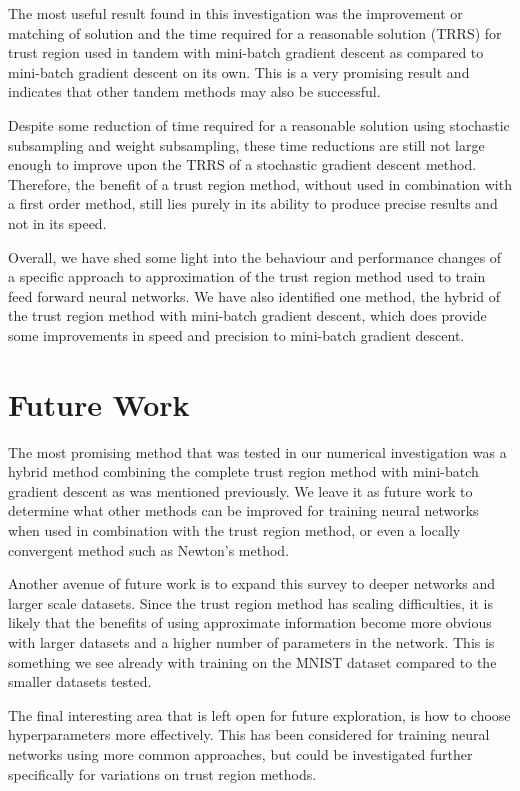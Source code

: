 \documentclass[letterpaper,12pt,titlepage,oneside,final]{book}
\begin{document}
	The most useful result found in this investigation was the improvement or matching of solution and the time required for a reasonable solution (TRRS) for trust region used in tandem with mini-batch gradient descent as compared to mini-batch gradient descent on its own. This is a very promising result and indicates that other tandem methods may also be successful.
	
	 Despite some reduction of time required for a reasonable solution using stochastic subsampling and weight subsampling, these time reductions are still not large enough to improve upon the TRRS of a stochastic gradient descent method. Therefore, the benefit of a trust region method, without used in combination with a first order method, still lies purely in its ability to produce precise results and not in its speed.
	
	Overall, we have shed some light into the behaviour and performance changes of a specific approach to approximation of the trust region method used to train feed forward neural networks. We have also identified one method, the hybrid of the trust region method with mini-batch gradient descent, which does provide some improvements in speed and precision to mini-batch gradient descent.
	

	\section{Future Work}
	
	The most promising method that was tested in our numerical investigation was a hybrid method combining the complete trust region method with mini-batch gradient descent as was mentioned previously. We leave it as future work to determine what other methods can be improved for training neural networks when used in combination with the trust region method, or even a locally convergent method such as Newton's method.
	
	Another avenue of future work is to expand this survey to deeper networks and larger scale datasets. Since the trust region method has scaling difficulties, it is likely that the benefits of using approximate information become more obvious with larger datasets and a higher number of parameters in the network. This is something we see already with training on the MNIST dataset compared to the smaller datasets tested.
	
	The final interesting area that is left open for future exploration, is how to choose hyperparameters more effectively. This has been considered for training neural networks using more common approaches, but could be investigated further specifically for variations on trust region methods. 
	
\end{document}
